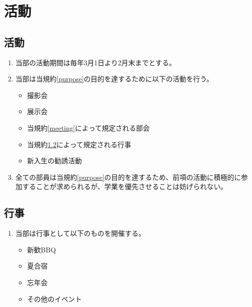 \documentclass[12pt, unicode, a4paper]{ltjsreport}
\begin{document}
\chapter{活動}
    \section{活動}\label{activity}
        \begin{enumerate}
            \item 当部の活動期間は毎年3月1日より2月末までとする。
            \item 当部は当規約\ref{purpose}の目的を達するために以下の活動を行う。
            \begin{itemize}
                \item 撮影会
                \item 展示会
                \item 当規約\ref{meeting}によって規定される部会
                \item 当規約\ref{event}によって規定される行事
                \item 新入生の勧誘活動
            \end{itemize}
            \item 全ての部員は当規約\ref{purpose}の目的を達するため、前項の活動に積極的に参加することが求められるが、学業を優先させることは妨げられない。
        \end{enumerate}

    \section{行事}\label{event}
        \begin{enumerate}
            \item 当部は行事として以下のものを開催する。
            \begin{itemize}
                \item 新歓BBQ
                \item 夏合宿
                \item 忘年会
                \item その他のイベント
            \end{itemize}
        \end{enumerate}
\end{document}
